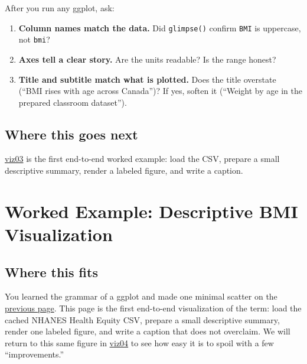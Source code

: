 \documentclass[
  letterpaper,
  DIV=11,
  numbers=noendperiod,
  oneside]{scrreprt}
\providecommand{\tightlist}{%
  \setlength{\itemsep}{0pt}\setlength{\parskip}{0pt}}
\begin{document}

After you run any ggplot, ask:

\begin{enumerate}
\def\labelenumi{\arabic{enumi}.}
\tightlist
\item
  \textbf{Column names match the data.} Did \texttt{glimpse()} confirm
  \texttt{BMI} is uppercase, not \texttt{bmi}?
\item
  \textbf{Axes tell a clear story.} Are the units readable? Is the range
  honest?
\item
  \textbf{Title and subtitle match what is plotted.} Does the title
  overstate (``BMI rises with age across Canada'')? If yes, soften it
  (``Weight by age in the prepared classroom dataset'').
\end{enumerate}

\section*{Where this goes next}\label{where-this-goes-next-1}


\href{viz03-worked-example.qmd}{viz03} is the first end-to-end worked
example: load the CSV, prepare a small descriptive summary, render a
labeled figure, and write a caption.

\chapter*{Worked Example: Descriptive BMI
Visualization}\label{worked-example-descriptive-bmi-visualization}


\section*{Where this fits}\label{where-this-fits-1}


You learned the grammar of a ggplot and made one minimal scatter on the
\hyperref[grammar-of-a-ggplot-and-your-first-plot]{previous page}. This
page is the first end-to-end visualization of the term: load the cached
NHANES Health Equity CSV, prepare a small descriptive summary, render
one labeled figure, and write a caption that does not overclaim. We will
return to this same figure in \href{viz04-misleading-design.qmd}{viz04}
to see how easy it is to spoil with a few ``improvements.''
\end{document}
